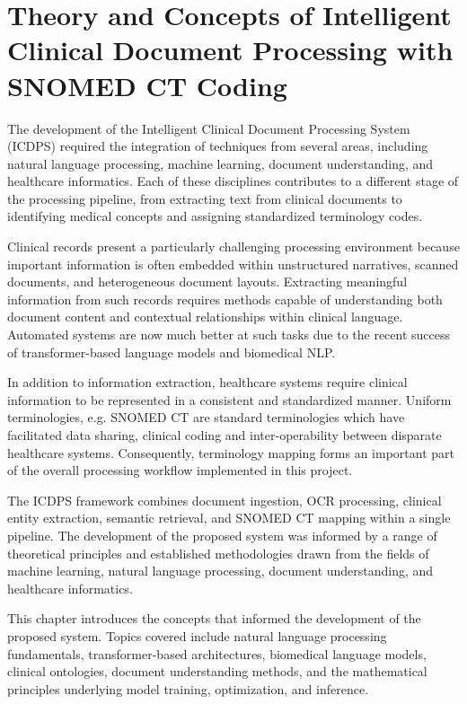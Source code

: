 \chapter{Theory and Concepts of Intelligent Clinical Document Processing with SNOMED CT Coding}

The development of the Intelligent Clinical Document Processing System (ICDPS) required the integration of techniques from several areas, including natural language processing, machine learning, document understanding, and healthcare informatics. Each of these disciplines contributes to a different stage of the processing pipeline, from extracting text from clinical documents to identifying medical concepts and assigning standardized terminology codes.

Clinical records present a particularly challenging processing environment because important information is often embedded within unstructured narratives, scanned documents, and heterogeneous document layouts. Extracting meaningful information from such records requires methods capable of understanding both document content and contextual relationships within clinical language. Automated systems are now much better at such tasks due to the recent success of transformer-based language models and biomedical NLP.

In addition to information extraction, healthcare systems require clinical information to be represented in a consistent and standardized manner. Uniform terminologies, e.g. SNOMED CT are standard terminologies which have facilitated data sharing, clinical coding and inter-operability between disparate healthcare systems. Consequently, terminology mapping forms an important part of the overall processing workflow implemented in this project.

The ICDPS framework combines document ingestion, OCR processing, clinical entity extraction, semantic retrieval, and SNOMED CT mapping within a single pipeline. The development of the proposed system was informed by a range of theoretical principles and established methodologies drawn from the fields of machine learning, natural language processing, document understanding, and healthcare informatics. 

This chapter introduces the concepts that informed the development of the proposed system. Topics covered include natural language processing fundamentals, transformer-based architectures, biomedical language models, clinical ontologies, document understanding methods, and the mathematical principles underlying model training, optimization, and inference.

